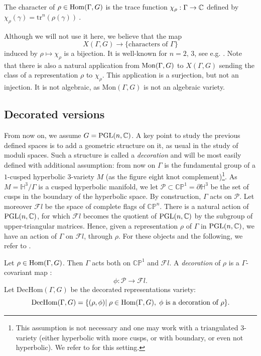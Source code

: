 \begin{defn} The character of $\rho\in\mathrm{Hom}(\Gamma,G)$ is the trace function
$\chi_\rho : \Gamma\rightarrow \mathbb{C}$ defined by $\chi_\rho(\gamma)={\mbox{tr}}^n(\rho(\gamma))\ $. 
\end{defn}
 
Although we will not use it here, we believe that the map 
$$ 
X(  \Gamma, G)\rightarrow \{\textrm{characters of }\Gamma\} 
$$
induced by $\rho \mapsto \chi_\rho$ is a bijection. It is well-known for $n=2,\, 3$, see e.g. \cite{Lawton}.
Note that there is also a natural application from $\mathrm{Mon}(\Gamma,G)$ to $X(\Gamma,G)$ sending the class of a representation $\rho$ to $\chi_\rho$. This application is a surjection, but not an injection. It is not algebraic, as $\mathrm{Mon}(\Gamma,G)$ is not an algebraic variety.

\subsection{Decorated versions}

From now on, we assume $G=\textrm{PGL}(n,\mathbb{C})$. A key point to study the previous defined spaces is to add a geometric structure on it, as usual in the study of moduli spaces. 
Such a structure is called a \emph{decoration} and will be most easily defined with additional assumption: from now on $\Gamma$ is the fundamental group of a $1$-cusped hyperbolic $3$-variety $M$ (as the figure eight knot complement)\footnote{This assumption is not necessary and one may work with a triangulated $3$-variety (either hyperbolic with more cusps, or with boundary, or even not hyperbolic). We refer to \cite{BFG} for this setting.}. As $M=\mathbb H^3/\Gamma$ is a cusped hyperbolic manifold, we let
 $\mathcal P\subset \mathbb{CP}^1=\partial \mathbb H^3$ be the set of cusps in the boundary of the hyperbolic space. By construction, $\Gamma$ acts on $\mathcal P$.
Let moreover $\mathcal Fl$ be the space of complete flags of $\mathbb{CP}^n$. There is a natural action of $\textrm{PGL}(n,\mathbb{C})$, for which $\mathcal Fl$ becomes the quotient of $\textrm{PGL}(n,\mathbb{C})$ by the subgroup of upper-triangular matrices. Hence, given a representation $\rho$ of $\Gamma$ in $\textrm{PGL}(n,\mathbb{C})$, we have an action of $\Gamma$ on $\mathcal Fl$, through $\rho$.  For these objects and the following, we refer to \cite{BFG}.

\newcommand{\DecHom}{\mathrm{DecHom}}

\begin{defn}
Let $\rho \in \mathrm{Hom}(\Gamma,G)$. Then $\Gamma$ acts both on $\mathbb{CP}^1$ and $\mathcal Fl$. A \emph{decoration} of $\rho$ is a $\Gamma$-covariant map :
$$\phi : \mathcal P\to \mathcal Fl.$$
Let $\DecHom(\Gamma,G)$ be the decorated representations variety:
$$\DecHom(\Gamma,G)=\{(\rho,\phi)|\; \rho\in \Hom(\Gamma,G), \; \phi\textrm{ is a decoration of }\rho\}.$$ 
\end{defn}


